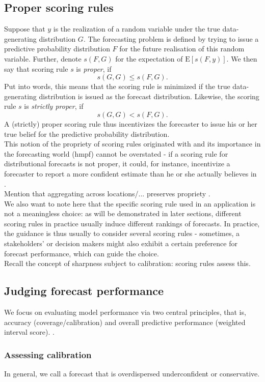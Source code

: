 \subsection{Proper scoring rules}
Suppose that $y$ is the realization of a random variable under the true data-generating distribution $G$. The forecasting problem is defined by trying to issue a predictive probability distribution $F$ for the future realisation of this random variable. Further, denote $s(F,G)$ for the expectation of $\text{E}[s(F,y)]$. We then say that scoring rule $s$ is \textit{proper}, if 
\[s(G,G) \leq s(F,G).\]
Put into words, this means that the scoring rule is minimized if the true data-generating distribution is issued as the forecast distribution. Likewise, the scoring rule $s$ is \textit{strictly proper}, if 
\[s(G,G) < s(F,G).\] 
A (strictly) proper scoring rule thus incentivizes the forecaster to issue his or her true belief for the predictive probability distribution.\\
This notion of the propriety of scoring rules originated with  and its importance in the forecasting world (hmpf) cannot be overstated - if a scoring rule for distributional forecasts is not proper, it could, for instance, incentivize a forecaster to report a more confident estimate than he or she actually believes in . \\
Mention that aggregating across locations/... preserves propriety \citep{bracher_evaluating_2021}.\\
We also want to note here that the specific scoring rule used in an application is not a meaningless choice: as will be demonstrated in later sections, different scoring rules in practice usually induce different rankings of forecasts. In practice, the guidance is thus usually to consider several scoring rules - sometimes, a stakeholders' or decision makers might also exhibit a certain preference for forecast performance, which can guide the choice.\\
Recall the concept of sharpness subject to calibration: scoring rules assess this.
\subsection{Judging forecast performance}
We focus on evaluating model performance via two central principles, that is, accuracy (coverage/calibration) and overall predictive performance (weighted interval score). \citep{sherratt_predictive_2022}.
\subsubsection{Assessing calibration}
In general, we call a forecast that is overdispersed underconfident or conservative.
